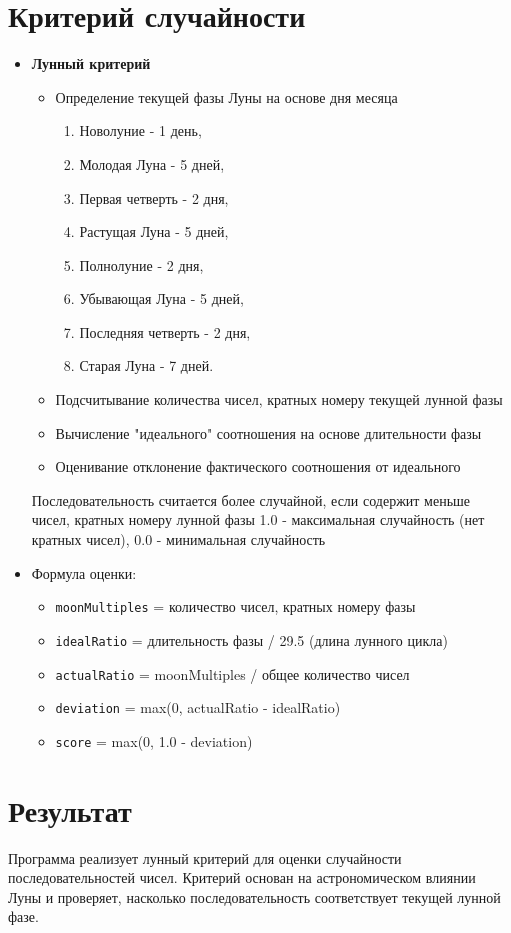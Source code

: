 \section{Критерий случайности}
\begin{itemize}
\item \textbf{Лунный критерий}
\begin{itemize}
\item Определение текущей фазы Луны на основе дня месяца
\begin{enumerate}
	\item Новолуние - 1 день,
	\item Молодая Луна - 5 дней,
	\item Первая четверть - 2 дня,
	\item Растущая Луна - 5 дней,
	\item Полнолуние - 2 дня,
	\item Убывающая Луна - 5 дней,
	\item Последняя четверть - 2 дня,
	\item Старая Луна - 7 дней.
\end{enumerate}
\item Подсчитывание количества чисел, кратных номеру текущей лунной фазы
\item Вычисление "идеального" соотношения на основе длительности фазы
\item Оценивание отклонение фактического соотношения от идеального
\end{itemize}
Последовательность считается более случайной, если содержит меньше чисел, кратных номеру лунной фазы
1.0 - максимальная случайность (нет кратных чисел), 0.0 - минимальная случайность


\item Формула оценки:
\begin{itemize}
\item \texttt{moonMultiples} = количество чисел, кратных номеру фазы
\item \texttt{idealRatio} = длительность фазы / 29.5 (длина лунного цикла)
\item \texttt{actualRatio} = moonMultiples / общее количество чисел
\item \texttt{deviation} = max(0, actualRatio - idealRatio)
\item \texttt{score} = max(0, 1.0 - deviation)
\end{itemize}
\end{itemize}

\newpage

\section{Результат}

Программа реализует лунный критерий для оценки случайности последовательностей чисел. Критерий основан на астрономическом влиянии Луны и проверяет, насколько последовательность соответствует текущей лунной фазе.

